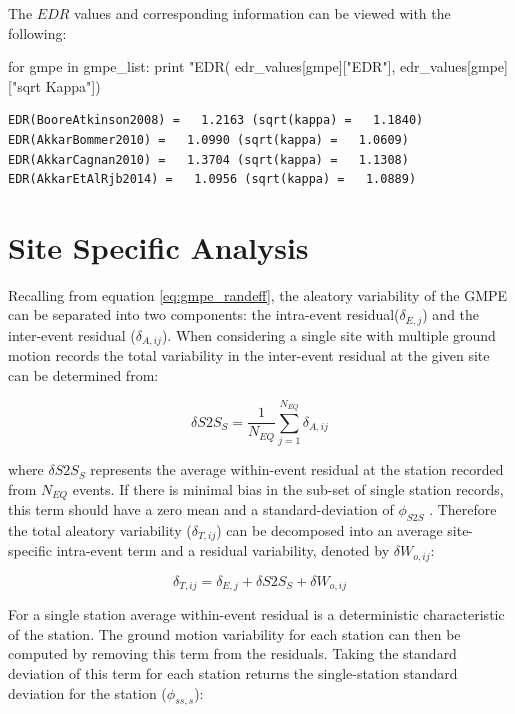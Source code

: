 The $EDR$ values and corresponding information can be viewed with the following:

\begin{python}
for gmpe in gmpe_list:
    print "EDR(%
        edr_values[gmpe]["EDR"], edr_values[gmpe]["sqrt Kappa"])
\end{python}

\begin{verbatim}
EDR(BooreAtkinson2008) =   1.2163 (sqrt(kappa) =   1.1840)
EDR(AkkarBommer2010) =   1.0990 (sqrt(kappa) =   1.0609)
EDR(AkkarCagnan2010) =   1.3704 (sqrt(kappa) =   1.1308)
EDR(AkkarEtAlRjb2014) =   1.0956 (sqrt(kappa) =   1.0889)
\end{verbatim}

\section{Site Specific Analysis}
\label{sec:site}

Recalling from equation \ref{eq:gmpe_randeff}, the aleatory variability of the GMPE can be separated into two components: the intra-event residual($\delta_{E,j}$) and the inter-event residual ($\delta_{A,ij}$). When considering a single site with multiple ground motion records the total variability in the inter-event residual at the given site can be determined from:

\begin{equation}
\delta S2S_S = \frac{1}{N_{EQ}} \sum\limits_{j = 1}^{N_{EQ}} \delta_{A,ij}
\end{equation}

\noindent where $\delta S2S_S$ represents the average within-event residual at the station recorded from $N_{EQ}$ events. If there is minimal bias in the sub-set of single station records, this term should have a zero mean and a standard-deviation of $\phi_{S2S}$ \parencite{RodriguezMarek_etal2011}. Therefore the total aleatory variability ($\delta_{T,ij}$) can be decomposed into an average site-specific intra-event term and a residual variability, denoted by $\delta W_{o,ij}$:

\begin{equation}
\delta_{T,ij} = \delta_{E,j} + \delta S2S_S + \delta W_{o,ij}
\end{equation}

For a single station average within-event residual is a deterministic characteristic of the station. The ground motion variability for each station can then be computed by removing this term from the residuals. Taking the standard deviation of this term for each station returns the single-station standard deviation for the station ($\phi_{ss,s}$):

